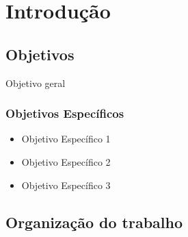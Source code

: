 \chapter{Introdução}\label{cap:introducao}

\lipsum[1-4]

\section{Objetivos}

Objetivo geral

\subsection{Objetivos Específicos}
\begin{itemize}
\item Objetivo Específico 1

\item Objetivo Específico 2

\item Objetivo Específico 3

\end{itemize}

\section{Organização do trabalho}

\lipsum[1]